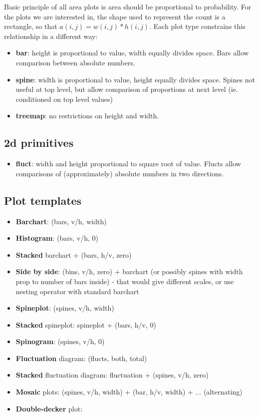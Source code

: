 \documentclass[letterpaper,oneside]{scrartcl}
\begin{document}
Basic principle of all area plots is area should be proportional to probability. For the plots we are interested in, the shape used to represent the count is a rectangle, so that $a(i, j) = w(i, j) * h(i, j)$. Each plot type constrains this relationship in a different way:

\begin{itemize}
  \item {\bf bar}: height is proportional to value, width equally divides space. Bars allow comparison between absolute numbers.

  \item {\bf spine}: width is proportional to value, height equally divides space. Spines not useful at top level, but allow comparison of proportions at next level (ie. conditioned on top level values)

  \item {\bf treemap}: no restrictions on height and width.

\end{itemize}

\subsection{2d primitives}

\begin{itemize}
  \item {\bf fluct}: width and height proportional to square root of value. Flucts allow comparisons of (approximately) absolute numbers in two directions. 
  
\end{itemize}

\subsection{Plot templates}

\begin{itemize}
  \item {\bf Barchart}: (bars, v/h, width)
  \item {\bf Histogram}: (bars, v/h, 0)
  \item {\bf Stacked} barchart + (bars, h/v, zero)
  \item {\bf Side by side}: (bins, v/h, zero) + barchart  (or possibly spines with width prop to number of bars inside) - that would  give different scales, or use nesting operator with standard barchart
  \item {\bf Spineplot}: (spines, v/h, width)
  \item {\bf Stacked} spineplot: spineplot + (bars, h/v, 0)
  \item {\bf Spinogram}: (spines, v/h, 0)
  \item {\bf Fluctuation} diagram: (flucts, both, total)
  \item {\bf Stacked} fluctuation diagram: fluctuation + (spines, v/h, zero)
  \item {\bf Mosaic} plots: (spines, v/h, width) + (bar, h/v, width) + ... (alternating)
  \item {\bf Double-decker} plot: 
\end{itemize}
\end{document}
